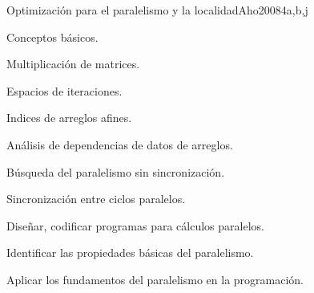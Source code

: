 \begin{syllabus}
\begin{unit}{Optimización para el paralelismo y la localidad}{}{Aho2008}{4}{a,b,j}
  \begin{topics}
     \item Conceptos básicos.
     \item Multiplicación de matrices.
     \item Espacios de iteraciones.
     \item Indices de arreglos afines.
     \item Análisis de dependencias de datos de arreglos.
     \item Búsqueda del paralelismo sin sincronización.
     \item Sincronización entre ciclos paralelos.
  \end{topics}

  \begin{learningoutcomes}
     \item Diseñar, codificar programas para cálculos paralelos.
     \item Identificar las propiedades básicas del paralelismo.
     \item Aplicar los fundamentos del paralelismo en la programación.
  \end{learningoutcomes}
\end{unit}

\begin{coursebibliography}
\end{coursebibliography}

\end{syllabus}
